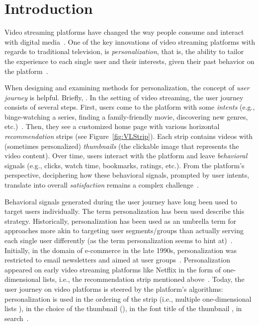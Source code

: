 
\chapter{Introduction}
\label{chapter:introduction}


Video streaming platforms have changed the way people consume and interact with digital media~\cite{NetflixReco}. 
One of the key innovations of video streaming platforms with regards to traditional television, is \emph{personalization}, that is, the ability to tailor the experience to each single user and their interests, given their past behavior on the platform~\cite{oldPersonalizationBehavior, oldPersonalizationSearch}. 

When designing and examining methods for personalization, the concept of \emph{user journey} is helpful. 
Briefly, .
In the setting of video streaming, the user journey consists of several steps.
First, users come to the platform with some \emph{intents} (e.g., binge-watching a series, finding a family-friendly movie, discovering new genres, etc.)~\cite{intent}. 
Then, they see a customized home page with various horizontal \emph{recommendation} strips (see Figure~\ref{fig:VLStrip}). 
Each strip contains videos with (sometimes personalized) \emph{thumbnails} (the clickable image that represents the video content). 
Over time, users interact with the platform and leave \emph{behavioral} signals (e.g., clicks, watch time, bookmarks, ratings, etc.). 
From the platform's perspective, deciphering how these behavioral signals, prompted by user intents, translate into overall \emph{satisfaction} remains a complex challenge~\todo{[REF]}.

Behavioral signals generated during the user journey have long been used to target users individually. 
The term personalization has been used describe this strategy. 
Historically, personalization has been used as an umbrella term for approaches more akin to targeting user segments/groups than actually serving each single user differently (as the term personalization seems to hint at)~\todo{[REF]}. 
Initially, in the domain of e-commerce in the late 1990s, personalization was restricted to email newsletters and aimed at user groups~\cite{oldReco}. 
Personalization appeared on early video streaming platforms like Netflix in the form of one-dimensional lists, i.e.,  the recommendation strip mentioned above~\cite{oldReco}. 
Today, the user journey on video platforms is steered by the platform's algorithms: personalization is used in the ordering of the strip (i.e., multiple one-dimensional lists \todo{[REF]}), in the choice of the thumbnail (\todo{[REF]}), in the font title of the thumbnail \todo{+ [REF]}, in search~\cite{NetflixReco}.

